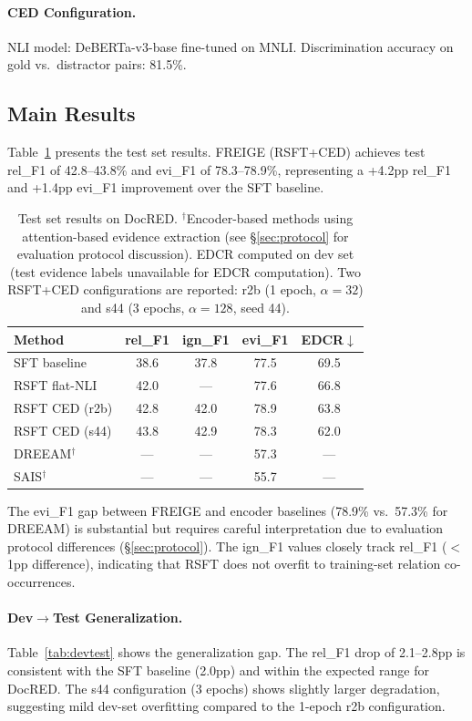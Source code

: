 \documentclass[11pt,a4paper]{article}
\newcommand{\method}{FREIGE}
\begin{document}
\paragraph{CED Configuration.} NLI model: DeBERTa-v3-base fine-tuned on MNLI. Discrimination accuracy on gold vs.\ distractor pairs: 81.5\%.

\subsection{Main Results}

Table~\ref{tab:main} presents the test set results. \method{} (RSFT+CED) achieves test rel\_F1 of 42.8--43.8\% and evi\_F1 of 78.3--78.9\%, representing a +4.2pp rel\_F1 and +1.4pp evi\_F1 improvement over the SFT baseline.

\begin{table}[t]
\centering
\small
\begin{tabular}{lcccc}
\toprule
\textbf{Method} & \textbf{rel\_F1} & \textbf{ign\_F1} & \textbf{evi\_F1} & \textbf{EDCR}$\downarrow$ \\
\midrule
SFT baseline & 38.6 & 37.8 & 77.5 & 69.5 \\
RSFT flat-NLI & 42.0 & --- & 77.6 & 66.8 \\
RSFT CED (r2b) & 42.8 & 42.0 & 78.9 & 63.8 \\
RSFT CED (s44) & 43.8 & 42.9 & 78.3 & 62.0 \\
\midrule
DREEAM$^\dagger$ & --- & --- & 57.3 & --- \\
SAIS$^\dagger$ & --- & --- & 55.7 & --- \\
\bottomrule
\end{tabular}
\caption{Test set results on DocRED. $^\dagger$Encoder-based methods using attention-based evidence extraction (see \S\ref{sec:protocol} for evaluation protocol discussion). EDCR computed on dev set (test evidence labels unavailable for EDCR computation). Two RSFT+CED configurations are reported: r2b (1 epoch, $\alpha{=}32$) and s44 (3 epochs, $\alpha{=}128$, seed 44).}
\label{tab:main}
\end{table}

The evi\_F1 gap between \method{} and encoder baselines (78.9\% vs.\ 57.3\% for DREEAM) is substantial but requires careful interpretation due to evaluation protocol differences (\S\ref{sec:protocol}). The ign\_F1 values closely track rel\_F1 ($<$1pp difference), indicating that RSFT does not overfit to training-set relation co-occurrences.

\paragraph{Dev$\to$Test Generalization.}
Table~\ref{tab:devtest} shows the generalization gap. The rel\_F1 drop of 2.1--2.8pp is consistent with the SFT baseline (2.0pp) and within the expected range for DocRED. The s44 configuration (3 epochs) shows slightly larger degradation, suggesting mild dev-set overfitting compared to the 1-epoch r2b configuration.
\end{document}
